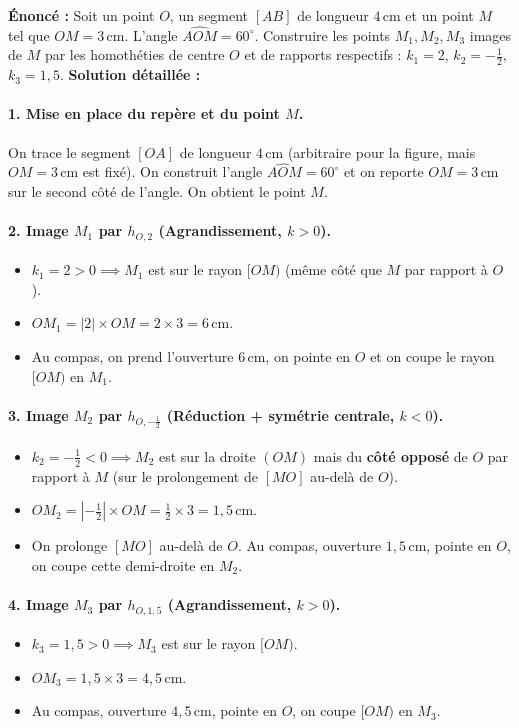 \documentclass[11pt]{article}
\begin{document}
\begin{exoresolu}
\textbf{Énoncé :} Soit un point $O$, un segment $[AB]$ de longueur $4\,\text{cm}$ et un point $M$ tel que $OM = 3\,\text{cm}$. L'angle $\widehat{AOM} = 60^\circ$.
Construire les points $M_1, M_2, M_3$ images de $M$ par les homothéties de centre $O$ et de rapports respectifs :
$k_1 = 2$, $k_2 = -\frac{1}{2}$, $k_3 = 1,5$.
\tcblower
\textbf{Solution détaillée :}
\paragraph{1. Mise en place du repère et du point $M$.}
On trace le segment $[OA]$ de longueur $4\,\text{cm}$ (arbitraire pour la figure, mais $OM=3\,\text{cm}$ est fixé). On construit l'angle $\widehat{AOM}=60^\circ$ et on reporte $OM=3\,\text{cm}$ sur le second côté de l'angle. On obtient le point $M$.

\paragraph{2. Image $M_1$ par $h_{O, 2}$ (Agrandissement, $k>0$).}
\begin{itemize}
    \item $k_1 = 2 > 0 \implies M_1$ est sur le rayon $[OM)$ (même côté que $M$ par rapport à $O$).
    \item $OM_1 = |2| \times OM = 2 \times 3 = 6\,\text{cm}$.
    \item Au compas, on prend l'ouverture $6\,\text{cm}$, on pointe en $O$ et on coupe le rayon $[OM)$ en $M_1$.
\end{itemize}
\paragraph{3. Image $M_2$ par $h_{O, -\frac{1}{2}}$ (Réduction + symétrie centrale, $k<0$).}
\begin{itemize}
    \item $k_2 = -\frac{1}{2} < 0 \implies M_2$ est sur la droite $(OM)$ mais du \textbf{côté opposé} de $O$ par rapport à $M$ (sur le prolongement de $[MO]$ au-delà de $O$).
    \item $OM_2 = |-\frac{1}{2}| \times OM = \frac{1}{2} \times 3 = 1,5\,\text{cm}$.
    \item On prolonge $[MO]$ au-delà de $O$. Au compas, ouverture $1,5\,\text{cm}$, pointe en $O$, on coupe cette demi-droite en $M_2$.
\end{itemize}
\paragraph{4. Image $M_3$ par $h_{O, 1,5}$ (Agrandissement, $k>0$).}
\begin{itemize}
    \item $k_3 = 1,5 > 0 \implies M_3$ est sur le rayon $[OM)$.
    \item $OM_3 = 1,5 \times 3 = 4,5\,\text{cm}$.
    \item Au compas, ouverture $4,5\,\text{cm}$, pointe en $O$, on coupe $[OM)$ en $M_3$.
\end{itemize}

\end{exoresolu}
\end{document}
